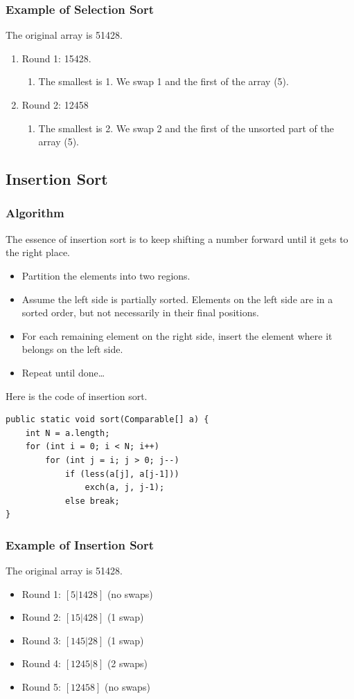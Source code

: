 \documentclass[letterpaper,12pt]{article}
\begin{document}
\subsubsection{Example of Selection Sort}
The original array is 51428.
\begin{enumerate}
    \item Round 1: 15428.
    \begin{enumerate}
        \item The smallest is 1. We swap 1 and the first of the array (5).
    \end{enumerate}
    \item Round 2: 12458
    \begin{enumerate}
        \item The smallest is 2. We swap 2 and the first of the unsorted part of the array (5).
    \end{enumerate}
\end{enumerate}

\subsection{Insertion Sort}
\subsubsection{Algorithm}
The essence of insertion sort is to keep shifting a number forward until it gets to the right place.
\begin{itemize}
    \item Partition the elements into two regions.
    \item Assume the left side is partially sorted. Elements on the left side are in a sorted order, but not necessarily in their final positions.
    \item For each remaining element on the right side, insert the element where it belongs on the left side.
    \item Repeat until done…
\end{itemize}
Here is the code of insertion sort.
\begin{verbatim}
public static void sort(Comparable[] a) {
    int N = a.length;
    for (int i = 0; i < N; i++)
        for (int j = i; j > 0; j--)
            if (less(a[j], a[j-1]))
                exch(a, j, j-1);
            else break;
}
\end{verbatim}
\subsubsection{Example of Insertion Sort}
The original array is 51428.
\begin{itemize}
    \item Round 1: $[5 | 1 4 2 8]$ (no swaps)
    \item Round 2: $[1 5 | 4 2 8]$ (1 swap)
    \item Round 3: $[1 4 5 | 2 8]$ (1 swap)
    \item Round 4: $[1 2 4 5 | 8]$ (2 swaps)
    \item Round 5: $[1 2 4 5 8]$ (no swaps)
\end{itemize}
\end{document}
